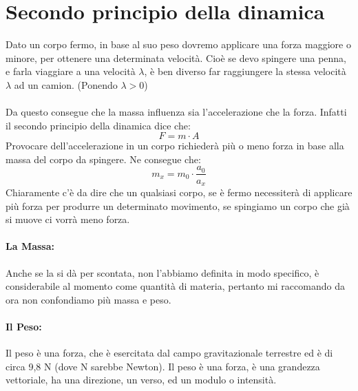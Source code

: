 \documentclass[12pt, a4paper, openany, oneside]{book}
\begin{document}
\section{Secondo principio della dinamica}
Dato un corpo fermo, in base al suo peso dovremo applicare una forza maggiore o
minore, per ottenere una determinata velocità. Cioè se devo spingere una penna, 
e farla viaggiare a una velocità $\lambda$, è ben diverso far raggiungere la
stessa velocità $\lambda$ ad un camion. (Ponendo $\lambda > 0$) \\ \\
Da questo consegue che la massa influenza sia l'accelerazione che la forza.
Infatti il secondo principio della dinamica dice che:
\[
F = m\cdot A
\]
Provocare dell'accelerazione in un corpo richiederà più o meno forza in base
alla massa del corpo da spingere. Ne consegue che:
\[
m_{x} = m_{0} \cdot \frac{a_{0}}{a_{x}}
\]	
Chiaramente c'è da dire che un qualsiasi corpo, se è fermo necessiterà di 
applicare più forza per produrre un determinato movimento, se spingiamo un corpo
che già si muove ci vorrà meno forza.
\paragraph{La Massa: } Anche se la si dà per scontata, non l'abbiamo definita in
modo specifico, è considerabile al momento come quantità di materia, pertanto
mi raccomando da ora non confondiamo più massa e peso.
\paragraph{Il Peso: } Il peso è una forza, che è esercitata dal campo gravitazionale
terrestre ed è di circa 9,8 N (dove N sarebbe Newton). Il peso è una forza, è una
grandezza vettoriale, ha una direzione, un verso, ed un modulo o intensità.
\end{document}
